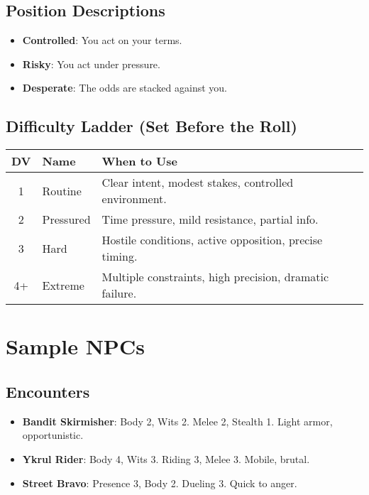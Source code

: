 \subsection*{Position Descriptions}

\begin{itemize}
    \item \textbf{Controlled}: You act on your terms.
    \item \textbf{Risky}: You act under pressure.
    \item \textbf{Desperate}: The odds are stacked against you.
\end{itemize}

\subsection*{Difficulty Ladder (Set Before the Roll)}

\begin{center}
\begin{tabular}{cll}
\toprule
\textbf{DV} & \textbf{Name} & \textbf{When to Use} \\
\midrule
1 & Routine & Clear intent, modest stakes, controlled environment. \\
2 & Pressured & Time pressure, mild resistance, partial info. \\
3 & Hard & Hostile conditions, active opposition, precise timing. \\
4+ & Extreme & Multiple constraints, high precision, dramatic failure. \\
\bottomrule
\end{tabular}
\end{center}

\section*{Sample NPCs}

\subsection*{Encounters}

\begin{itemize}
    \item \textbf{Bandit Skirmisher}: Body 2, Wits 2. Melee 2, Stealth 1. Light armor, opportunistic.
    \item \textbf{Ykrul Rider}: Body 4, Wits 3. Riding 3, Melee 3. Mobile, brutal.
    \item \textbf{Street Bravo}: Presence 3, Body 2. Dueling 3. Quick to anger.
\end{itemize}


